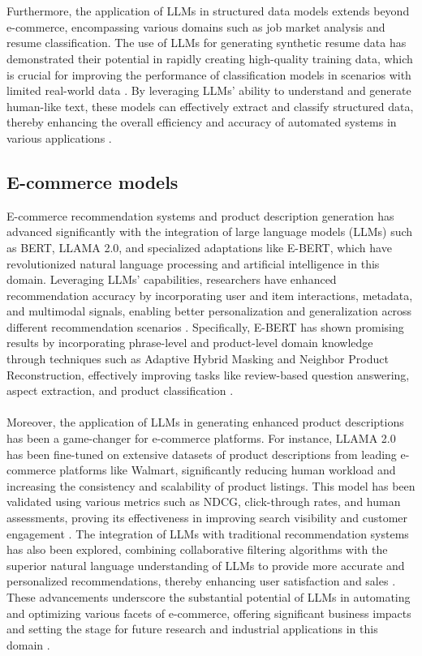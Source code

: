 \\\\
Furthermore, the application of LLMs in structured data models extends beyond e-commerce, encompassing various domains such as job market analysis and resume classification. The use of LLMs for generating synthetic resume data has demonstrated their potential in rapidly creating high-quality training data, which is crucial for improving the performance of classification models in scenarios with limited real-world data \cite{skondras2023generating}. By leveraging LLMs' ability to understand and generate human-like text, these models can effectively extract and classify structured data, thereby enhancing the overall efficiency and accuracy of automated systems in various applications \cite{tang2024strucbench}.

\subsection*{E-commerce models}
E-commerce recommendation systems and product description generation has advanced significantly with the integration of large language models (LLMs) such as BERT, LLAMA 2.0, and specialized adaptations like E-BERT, which have revolutionized natural language processing and artificial intelligence in this domain. Leveraging LLMs' capabilities, researchers have enhanced recommendation accuracy by incorporating user and item interactions, metadata, and multimodal signals, enabling better personalization and generalization across different recommendation scenarios \cite{xu2024emerging}. Specifically, E-BERT has shown promising results by incorporating phrase-level and product-level domain knowledge through techniques such as Adaptive Hybrid Masking and Neighbor Product Reconstruction, effectively improving tasks like review-based question answering, aspect extraction, and product classification \cite{zhang2021ebert}.
\\\\
Moreover, the application of LLMs in generating enhanced product descriptions has been a game-changer for e-commerce platforms. For instance, LLAMA 2.0 has been fine-tuned on extensive datasets of product descriptions from leading e-commerce platforms like Walmart, significantly reducing human workload and increasing the consistency and scalability of product listings. This model has been validated using various metrics such as NDCG, click-through rates, and human assessments, proving its effectiveness in improving search visibility and customer engagement \cite{zhou2023leveraging}. The integration of LLMs with traditional recommendation systems has also been explored, combining collaborative filtering algorithms with the superior natural language understanding of LLMs to provide more accurate and personalized recommendations, thereby enhancing user satisfaction and sales \cite{xu2024emerging}. These advancements underscore the substantial potential of LLMs in automating and optimizing various facets of e-commerce, offering significant business impacts and setting the stage for future research and industrial applications in this domain \cite{zhou2023leveraging}.


